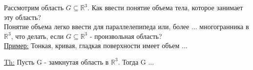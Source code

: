
Рассмотрим область $G \subseteq \mathbb{R}^3$. Как ввести понятие объема тела, которое занимает эту область? \\

Понятие объема легко ввести для параллелепипеда или, более ... многогранника в $\mathbb{R}^3$, что делать, если $G \subseteq \mathbb{R}^3$ - произвольная область? \\

\underline{Пример:} Тонкая, кривая, гладкая поверхности имеет объем ...


\underline{Th:} Пусть G - замкнутая область в $\mathbb{R}^3$. Тогда G ...